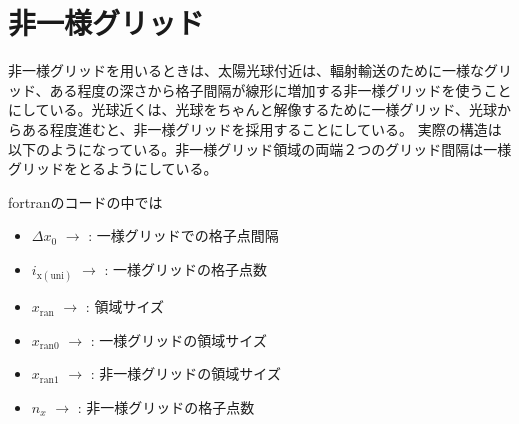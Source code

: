 \documentclass[letterpaper,10pt,dvipdfmx,report]{sphinxmanual}
\begin{document}
\begin{sphinxVerbatim}[commandchars=\\\{\}]
\end{sphinxVerbatim}


\section{非一様グリッド}
\label{\detokenize{geometry:id3}}
\sphinxAtStartPar
非一様グリッドを用いるときは、太陽光球付近は、輻射輸送のために一様なグリッド、ある程度の深さから格子間隔が線形に増加する非一様グリッドを使うことにしている。光球近くは、光球をちゃんと解像するために一様グリッド、光球からある程度進むと、非一様グリッドを採用することにしている。
実際の構造は以下のようになっている。非一様グリッド領域の両端２つのグリッド間隔は一様グリッドをとるようにしている。

\sphinxAtStartPar
fortranのコードの中では
\begin{itemize}
\item {} 
\sphinxAtStartPar
\(\Delta x_0\) \(\rightarrow\)  : 一様グリッドでの格子点間隔

\item {} 
\sphinxAtStartPar
\(i_\mathrm{x\left(uni\right)}\) \(\rightarrow\) : 一様グリッドの格子点数

\item {} 
\sphinxAtStartPar
\(x_\mathrm{ran}\) \(\rightarrow\) : 領域サイズ

\item {} 
\sphinxAtStartPar
\(x_\mathrm{ran0}\) \(\rightarrow\) : 一様グリッドの領域サイズ

\item {} 
\sphinxAtStartPar
\(x_\mathrm{ran1}\) \(\rightarrow\) : 非一様グリッドの領域サイズ

\item {} 
\sphinxAtStartPar
\(n_x\) \(\rightarrow\)  : 非一様グリッドの格子点数

\end{itemize}
\end{document}
